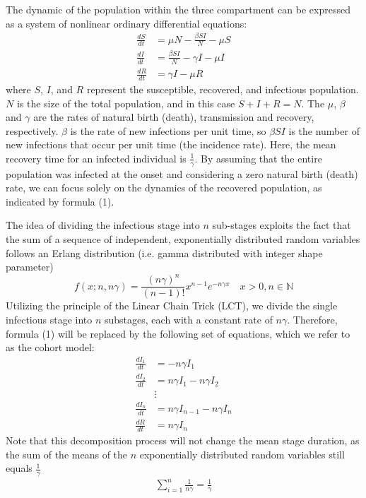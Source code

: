 \documentclass[12pt]{article}
\begin{document}
The dynamic of the population within the three compartment can be expressed as a system of nonlinear ordinary differential equations:
\begin{align}
    \frac{dS}{dt} &= \mu N - \frac{\beta SI}{N} - \mu S \\
    \frac{dI}{dt} &= \frac{\beta SI}{N} - \gamma I - \mu I \\
    \frac{dR}{dt} &= \gamma I - \mu R
\end{align}
where $S$, $I$, and $R$ represent the susceptible, recovered, and infectious population. $N$ is the size of the total population, and in this case $S + I + R = N$. The $\mu$, $\beta$ and $\gamma$ are the rates of natural birth (death), transmission and recovery, respectively. $\beta$ is the rate of new infections per unit time, so $\beta SI$ is the number of new infections that occur per unit time (the incidence rate). Here, the mean recovery time for an infected individual is $\frac{1}{\gamma}$. By assuming that the entire population was infected at the onset and considering a zero natural birth (death) rate, we can focus solely on the dynamics of the recovered population, as indicated by formula (1). 

The idea of dividing the infectious stage into $n$ sub-stages exploits the fact that the sum of a sequence of independent, exponentially distributed random variables follows an Erlang distribution (i.e. gamma distributed with integer shape parameter) \cite{therrien2018probability}
\begin{equation}
    f(x; n,n\gamma) = \frac{(n\gamma)^n}{(n-1)!} x^{n-1} e^{-n\gamma x} \quad x>0, n \in \mathbb{N}
\end{equation}
Utilizing the principle of the Linear Chain Trick (LCT), we divide the single infectious stage into $n$ substages, each with a constant rate of $n\gamma$. Therefore, formula (1) will be replaced by the following set of equations, which we refer to as the cohort model:
\begin{align}
    \frac{dI_1}{dt} &= - n \gamma I_1 \\
    \frac{dI_2}{dt} &= n\gamma I_1 - n \gamma I_2 \\
    &\vdots \\
    \frac{dI_n}{dt} &= n\gamma I_{n-1} - n \gamma I_n \\
    \frac{dR}{dt} &= n \gamma I_n
\end{align}
Note that this decomposition process will not change the mean stage duration, as the sum of the means of the $n$ exponentially distributed random variables still equals $\frac{1}{\gamma}$
\begin{align*}
    \sum_{i=1}^{n} \frac{1}{n\gamma} = \frac{1}{\gamma}
\end{align*}
\end{document}
